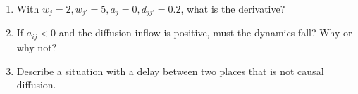 \begin{selfcheck}
\begin{enumerate}
  \item With $w_j=2,w_{j'}=5,a_j=0,d_{jj'}=0.2$, what is the derivative?
  \item If $a_{ij}<0$ and the diffusion inflow is positive, must the dynamics fall? Why or why not?
  \item Describe a situation with a delay between two places that is not causal diffusion.
\end{enumerate}
\end{selfcheck}
